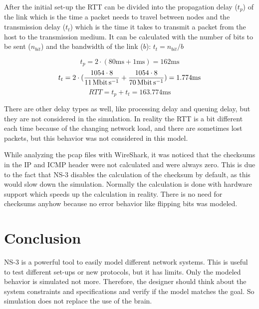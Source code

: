 \documentclass[parskip=full]{scrartcl}
\begin{document}
After the initial set-up the RTT can be divided into the propagation delay ($ t_p $) of the link which is the time a packet needs to travel between nodes and the transmission delay ($ t_t $) which is the time it takes to transmit a packet from the host to the transmission medium.  It can be calculated with the number of bits to be sent ($n_{bit}$) and the bandwidth of the link ($b$): $ t_t = n_{bit}/b$

\[t_p = 2\cdot(80 \si{\milli\second}+1 \si{\milli\second}) = 162 \si{\milli\second} \]
\[t_t = 2\cdot(\frac{1054\cdot8}{\SI{11}{\mega\bit\per\second}} +\frac{1054\cdot8}{\SI{70}{\mega\bit\per\second}}) = 1.774 \si{\milli\second} \]
\[ RTT = t_p + t_t = 163.774 \si{\milli\second} \]

There are other delay types as well, like processing delay and queuing delay, but they are not considered in the simulation. 
In reality the RTT is a bit different each time because of the changing network load, and there are sometimes lost packets,  but this behavior was not considered in this model.

While analyzing the pcap files with WireShark, it was noticed that the checksums in the IP and ICMP header were not calculated and were always zero. 
This is due to the fact that NS-3 disables the calculation of the checksum by default, as this would slow down the simulation.
Normally the calculation is done with hardware support which speeds up the calculation in reality. 
There is no need for checksums anyhow because no error behavior like flipping bits was modeled.



\section{Conclusion}
NS-3 is a powerful tool to easily model different network systems. This is useful to test different set-ups or new protocols, but it has limits.
Only the modeled behavior is simulated not more. Therefore, the designer should think about the system constraints and specifications and verify if the model matches the goal. So simulation does not replace the use of the brain.



\printbibliography
\end{document}
